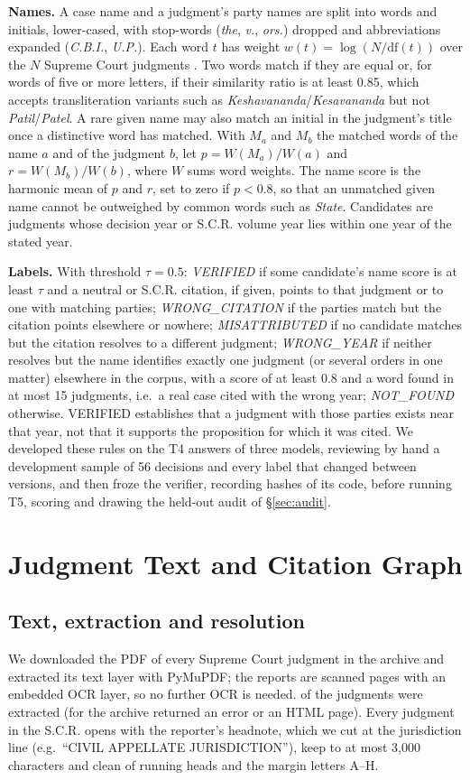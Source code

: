 \documentclass[conference]{IEEEtran}
\begin{document}
\textbf{Names.} A case name and a judgment's party names are split into words and initials, lower-cased, with stop-words (\emph{the}, \emph{v.}, \emph{ors.}) dropped and abbreviations expanded (\emph{C.B.I.}, \emph{U.P.}). Each word $t$ has weight $w(t)=\log(N/\mathrm{df}(t))$ over the $N$ Supreme Court judgments \cite{sparckjones}. Two words match if they are equal or, for words of five or more letters, if their similarity ratio \cite{difflib} is at least 0.85, which accepts transliteration variants such as \emph{Keshavananda}/\emph{Kesavananda} but not \emph{Patil}/\emph{Patel}. A rare given name may also match an initial in the judgment's title once a distinctive word has matched. With $M_a$ and $M_b$ the matched words of the name $a$ and of the judgment $b$, let $p=W(M_a)/W(a)$ and $r=W(M_b)/W(b)$, where $W$ sums word weights. The name score is the harmonic mean of $p$ and $r$, set to zero if $p<0.8$, so that an unmatched given name cannot be outweighed by common words such as \emph{State}. Candidates are judgments whose decision year or S.C.R. volume year lies within one year of the stated year.

\textbf{Labels.} With threshold $\tau=0.5$: \emph{VERIFIED} if some candidate's name score is at least $\tau$ and a neutral or S.C.R. citation, if given, points to that judgment or to one with matching parties; \emph{WRONG\_CITATION} if the parties match but the citation points elsewhere or nowhere; \emph{MISATTRIBUTED} if no candidate matches but the citation resolves to a different judgment; \emph{WRONG\_YEAR} if neither resolves but the name identifies exactly one judgment (or several orders in one matter) elsewhere in the corpus, with a score of at least 0.8 and a word found in at most 15 judgments, i.e.\ a real case cited with the wrong year; \emph{NOT\_FOUND} otherwise. VERIFIED establishes that a judgment with those parties exists near that year, not that it supports the proposition for which it was cited. We developed these rules on the T4 answers of three models, reviewing by hand a development sample of 56 decisions and every label that changed between versions, and then froze the verifier, recording hashes of its code, before running T5, scoring and drawing the held-out audit of \S\ref{sec:audit}.

\section{Judgment Text and Citation Graph}
\label{sec:graph}
\subsection{Text, extraction and resolution}
We downloaded the PDF of every Supreme Court judgment in the archive and extracted its text layer with PyMuPDF; the reports are scanned pages with an embedded OCR layer, so no further OCR is needed. \GraphTextOK{} of the \CorpusSC{} judgments were extracted (for \GraphTextFail{} the archive returned an error or an HTML page). Every judgment in the S.C.R. opens with the reporter's headnote, which we cut at the jurisdiction line (e.g.\ ``CIVIL APPELLATE JURISDICTION''), keep to at most 3{,}000 characters and clean of running heads and the margin letters A--H.
\end{document}
